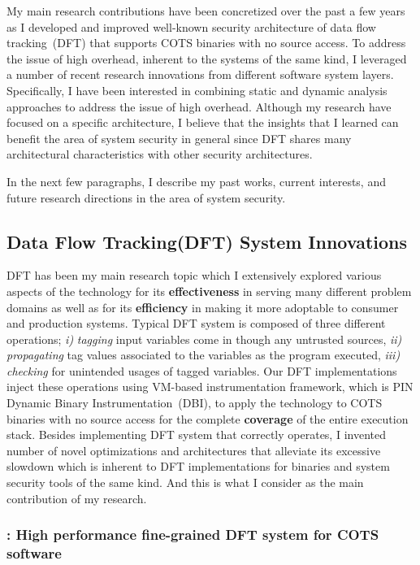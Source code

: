 \documentclass[letterpaper, 10pt]{article}
\begin{document}
\begin{small}
My main research contributions have been concretized over the past a few years
as I developed and improved well-known security architecture of data flow
tracking~(DFT) that supports COTS binaries with no source access.
%
To address the issue of high overhead, inherent to the systems of the same
kind, I leveraged a number of recent research innovations from different
software system layers. Specifically, I have been interested in combining
static and dynamic analysis approaches to address the issue of high overhead.
%
Although my research have focused on a specific architecture, I believe that
the insights that I learned can benefit the area of system security in general
since DFT shares many architectural characteristics with other security
architectures.

In the next few paragraphs, I describe my past works, current interests, and
future research directions in the area of system security.

\subsection*{Data Flow Tracking(DFT) System Innovations}
%
DFT has been my main research topic which I extensively explored various
aspects of the technology for its {\bf effectiveness} in serving many different
problem domains as well as for its {\bf efficiency} in making it more adoptable
to consumer and production systems.
%
Typical DFT system is composed of three different operations; {\it i)} {\it
tagging} input variables come in though any untrusted sources, {\it ii)} {\it
propagating} tag values associated to the variables as the program executed,
{\it iii)} {\it checking} for unintended usages of tagged variables. 
%
Our DFT implementations inject these operations using VM-based instrumentation
framework, which is PIN Dynamic Binary Instrumentation~(DBI), to apply the
technology to COTS binaries with no source access for the complete {\bf
coverage} of the entire execution stack.
%
Besides implementing DFT system that correctly operates, I invented number of
novel optimizations and architectures that alleviate its excessive slowdown
which is inherent to DFT implementations for binaries and system security tools
of the same kind. And this is what I consider as the main contribution of my
research.

\subsubsection*{\libdft: High performance fine-grained DFT system for COTS
software}


\end{small}
\end{document}
